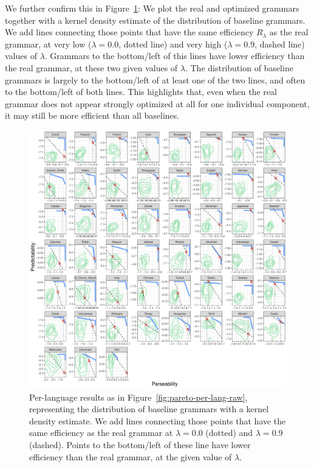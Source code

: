 \documentclass[10pt,twoside,lineno]{article}
\begin{document}
We further confirm this in Figure~\ref{fig:lambda-halfplane-09}:
We plot the real and optimized grammars together with a kernel density estimate of the distribution of baseline grammars.
We add lines connecting those points that have the same efficiency $R_\lambda$ as the real grammar, at very low ($\lambda = 0.0$, dotted line) and very high ($\lambda = 0.9$, dashed line) values of $\lambda$.
Grammars to the bottom/left of this lines have lower efficiency than the real grammar, at these two given values of $\lambda$.
The distribution of baseline grammars is largely to the bottom/left of at least one of the two lines, and often to the bottom/left of both lines.
This highlights that, even when the real grammar does not appear strongly optimized at all for one individual component, it may still be more efficient than all baselines.

\begin{figure}
\centering
\includegraphics[width=\textwidth]{../results/plane/analyze_pareto_optimality/pareto-plane-perLanguage-arrows-smoothed-halfspace-untransformed.pdf}
	\caption[]{Per-language results as in Figure~\ref{fig:pareto-per-lang-raw}, representing the distribution of baseline grammars with a kernel density estimate. We add lines connecting those points that have the same efficiency as the real grammar at $\lambda = 0.0$ (dotted) and $\lambda = 0.9$ (dashed). Points to the bottom/left of these line have lower efficiency than the real grammar, at the given value of $\lambda$.}\label{fig:lambda-halfplane-09}
\end{figure}
\end{document}
